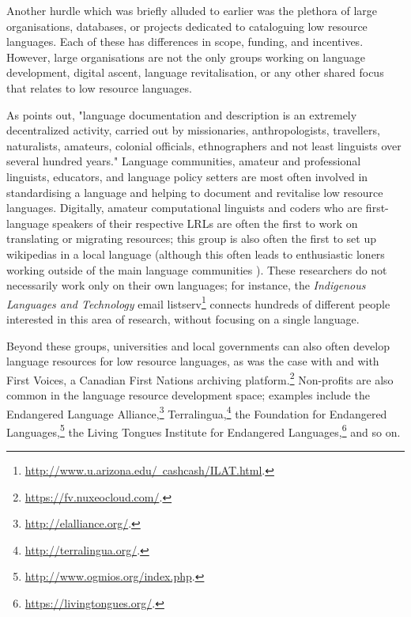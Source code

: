 Another hurdle which was briefly alluded to earlier was the plethora of large organisations, databases, or projects dedicated to cataloguing low resource languages. Each of these has differences in scope, funding, and incentives. However, large organisations are not the only groups working on language development, digital ascent, language revitalisation, or any other shared focus that relates to low resource languages.

As \citet{hammarstrom2015unesco} points out, "language documentation and description is an extremely decentralized activity, carried out by missionaries, anthropologists, travellers, naturalists, amateurs, colonial officials, ethnographers and not least linguists over several hundred years." Language communities, amateur and professional linguists, educators, and language policy setters are most often involved in standardising a language and helping to document and revitalise low resource languages. Digitally, amateur computational linguists and coders who are first-language speakers of their respective LRLs are often the first to work on translating or migrating resources; this group is also often the first to set up wikipedias in a local language (although this often leads to enthusiastic loners working outside of the main language communities \citep{soria2017digital}). These researchers do not necessarily work only on their own languages; for instance, the {\it Indigenous Languages and Technology} email listserv\footnote{\href{http://www.u.arizona.edu/~cashcash/ILAT.html}{http://www.u.arizona.edu/~cashcash/ILAT.html}. } connects hundreds of different people interested in this area of research, without focusing on a single language.

Beyond these groups, universities and local governments can also often develop language resources for low resource languages, as was the case with \citet{rognvaldsson2009icelandic} and with First Voices, a Canadian First Nations archiving platform.\footnote{\href{https://fv.nuxeocloud.com/}{https://fv.nuxeocloud.com/}. } Non-profits are also common in the language resource development space; examples include the Endangered Language Alliance,\footnote{\href{http://elalliance.org/}{http://elalliance.org/}. } Terralingua,\footnote{\href{http://terralingua.org/}{http://terralingua.org/}. } the Foundation for Endangered Languages,\footnote{\href{http://www.ogmios.org/index.php}{http://www.ogmios.org/index.php}. } the Living Tongues Institute for Endangered Languages,\footnote{\href{https://livingtongues.org/}{https://livingtongues.org/}. } and so on.

